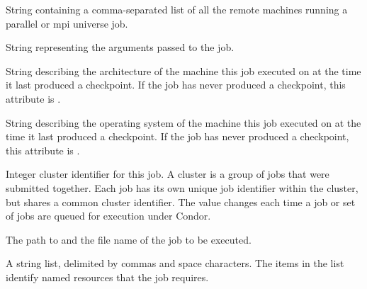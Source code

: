 \begin{description}


\item[\AdAttr{AllRemoteHosts}:]  String containing a comma-separated list
of all the remote machines running a parallel or mpi universe job.

\item[\AdAttr{Args}:]  String representing the arguments passed to the job.

\item[\AdAttr{CkptArch}:]  String describing the architecture of the machine
this job executed on at the time it last produced a checkpoint.
If the job has never produced a checkpoint,
this attribute is .

\item[\AdAttr{CkptOpSys}:]  String describing the operating system of
the machine
this job executed on at the time it last produced a checkpoint.
If the job has never produced a checkpoint,
this attribute is .

\item[\AdAttr{ClusterId}:]  Integer cluster identifier for this job.
A cluster is a group of jobs that were submitted together.  Each
job has its own unique job identifier within the cluster, but shares a
common cluster identifier.
The value changes each time a job or set of jobs are queued for
execution under Condor.

\item[\AdAttr{Cmd}:]  The path to and the file name of the job to be executed.

\item[\AdAttr{ConcurrencyLimits}:]  A string list,
delimited by commas and space characters.
The items in the list
identify named resources that the job requires.


\end{description}
